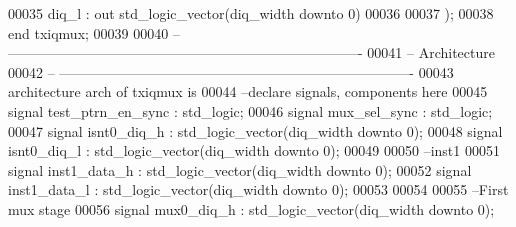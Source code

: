 \begin{DoxyCode}
00035       \textcolor{vhdlchar}{diq_l}             \textcolor{vhdlchar}{:} \textcolor{keywordflow}{out} \textcolor{comment}{std\_logic\_vector}\textcolor{vhdlchar}{(}\textcolor{vhdlchar}{diq_width} \textcolor{keywordflow}{downto} \textcolor{vhdllogic}{}\textcolor{vhdllogic}{0}\textcolor{vhdlchar}{)}
00036 
00037         \textcolor{vhdlchar}{)};
00038 \textcolor{keywordflow}{end} \textcolor{vhdlchar}{txiqmux};
00039 
00040 \textcolor{keyword}{-- ----------------------------------------------------------------------------}
00041 \textcolor{keyword}{-- Architecture}
00042 \textcolor{keyword}{-- ----------------------------------------------------------------------------}
00043 \textcolor{keywordflow}{architecture} arch \textcolor{keywordflow}{of} txiqmux is
00044 \textcolor{keyword}{--declare signals,  components here}
00045 \textcolor{keywordflow}{signal} \textcolor{vhdlchar}{test_ptrn_en_sync}   \textcolor{vhdlchar}{:} \textcolor{comment}{std\_logic};
00046 \textcolor{keywordflow}{signal} \textcolor{vhdlchar}{mux_sel_sync}        \textcolor{vhdlchar}{:} \textcolor{comment}{std\_logic};
00047 \textcolor{keywordflow}{signal} \textcolor{vhdlchar}{isnt0_diq_h}         \textcolor{vhdlchar}{:} \textcolor{comment}{std\_logic\_vector}\textcolor{vhdlchar}{(}\textcolor{vhdlchar}{diq_width} \textcolor{keywordflow}{downto} \textcolor{vhdllogic}{}\textcolor{vhdllogic}{0}\textcolor{vhdlchar}{)};
00048 \textcolor{keywordflow}{signal} \textcolor{vhdlchar}{isnt0_diq_l}         \textcolor{vhdlchar}{:} \textcolor{comment}{std\_logic\_vector}\textcolor{vhdlchar}{(}\textcolor{vhdlchar}{diq_width} \textcolor{keywordflow}{downto} \textcolor{vhdllogic}{}\textcolor{vhdllogic}{0}\textcolor{vhdlchar}{)};
00049 
00050 \textcolor{keyword}{--inst1 }
00051 \textcolor{keywordflow}{signal} \textcolor{vhdlchar}{inst1_data_h}         \textcolor{vhdlchar}{:} \textcolor{comment}{std\_logic\_vector}\textcolor{vhdlchar}{(}\textcolor{vhdlchar}{diq_width} \textcolor{keywordflow}{downto} \textcolor{vhdllogic}{}\textcolor{vhdllogic}{0}\textcolor{vhdlchar}{)};
00052 \textcolor{keywordflow}{signal} \textcolor{vhdlchar}{inst1_data_l}         \textcolor{vhdlchar}{:} \textcolor{comment}{std\_logic\_vector}\textcolor{vhdlchar}{(}\textcolor{vhdlchar}{diq_width} \textcolor{keywordflow}{downto} \textcolor{vhdllogic}{}\textcolor{vhdllogic}{0}\textcolor{vhdlchar}{)};
00053 
00054 
00055 \textcolor{keyword}{--First mux stage}
00056 \textcolor{keywordflow}{signal} \textcolor{vhdlchar}{mux0_diq_h}          \textcolor{vhdlchar}{:} \textcolor{comment}{std\_logic\_vector}\textcolor{vhdlchar}{(}\textcolor{vhdlchar}{diq_width} \textcolor{keywordflow}{downto} \textcolor{vhdllogic}{}\textcolor{vhdllogic}{0}\textcolor{vhdlchar}{)};

\end{DoxyCode}
